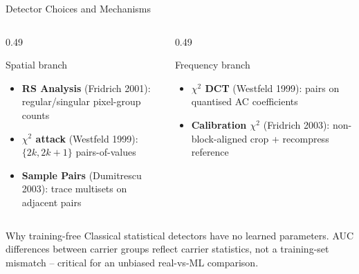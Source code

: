 \documentclass[aspectratio=169,11pt]{beamer}
\newcommand{\icite}[1]{{\footnotesize\color{umgray!85}#1}}
\begin{document}
\begin{frame}{Detector Choices and Mechanisms}
\small
\begin{columns}[T]
\begin{column}{0.49\textwidth}
\begin{block}{Spatial branch}
\begin{itemize}
\item \textbf{RS Analysis} \icite{(Fridrich 2001):} regular/singular pixel-group counts
\item \textbf{$\chi^2$ attack} \icite{(Westfeld 1999):} $\{2k, 2k\!+\!1\}$ pairs-of-values
\item \textbf{Sample Pairs} \icite{(Dumitrescu 2003):} trace multisets on adjacent pairs
\end{itemize}
\end{block}
\end{column}
\begin{column}{0.49\textwidth}
\begin{block}{Frequency branch}
\begin{itemize}
\item \textbf{$\chi^2$ DCT} \icite{(Westfeld 1999):} pairs on quantised AC coefficients
\item \textbf{Calibration $\chi^2$} \icite{(Fridrich 2003):} non-block-aligned crop + recompress reference
\end{itemize}
\end{block}
\end{column}
\end{columns}
\vspace{0.1cm}
\begin{alertblock}{Why training-free}
Classical statistical detectors have no learned parameters. AUC differences between carrier groups reflect carrier statistics, not a training-set mismatch -- critical for an unbiased real-vs-ML comparison.
\end{alertblock}
\end{frame}

\end{document}
